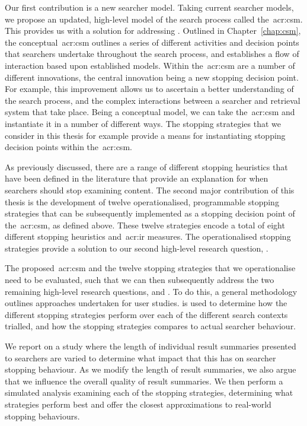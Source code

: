 \noindent
{} Our first contribution is a new searcher model. Taking current searcher models, we propose an updated, high-level model of the search process called the~\gls{acr:csm}. This provides us with a solution for addressing . Outlined in Chapter~\ref{chap:csm}, the conceptual~\gls{acr:csm} outlines a series of different activities and decision points that searchers undertake throughout the search process, and establishes a flow of interaction based upon established models. Within the~\gls{acr:csm} are a number of different innovations, the central innovation being a new stopping decision point. For example, this improvement allows us to ascertain a better understanding of the search process, and the complex interactions between a searcher and retrieval system that take place. Being a conceptual model, we can take the~\gls{acr:csm} and instantiate it in a number of different ways. The stopping strategies that we consider in this thesis for example provide a means for instantiating stopping decision points within the~\gls{acr:csm}.

\noindent
{} As previously discussed, there are a range of different stopping heuristics that have been defined in the literature that provide an explanation for when searchers should stop examining content. The second major contribution of this thesis is the development of twelve operationalised, programmable stopping strategies that can be subsequently implemented as a stopping decision point of the~\gls{acr:csm}, as defined above. These twelve strategies encode a total of eight different stopping heuristics and~\gls{acr:ir} measures. The operationalised stopping strategies provide a solution to our second high-level research question, .

\noindent
{} The proposed~\gls{acr:csm} and the twelve stopping strategies that we operationalise need to be evaluated, such that we can then subsequently address the two remaining high-level research questions,  and . To do this, a general methodology outlines approaches undertaken for user studies.  is used to determine how the different stopping strategies perform over each of the different search contexts trialled, and how the stopping strategies compares to actual searcher behaviour.

\noindent
{} We report on a study where the length of individual result summaries presented to searchers are varied to determine what impact that this has on searcher stopping behaviour. As we modify the length of result summaries, we also argue that we influence the overall quality of result summaries. We then perform a simulated analysis examining each of the stopping strategies, determining what strategies perform best and offer the closest approximations to real-world stopping behaviours.

